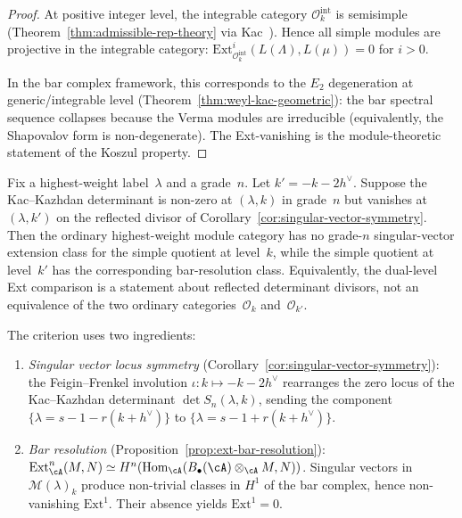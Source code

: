 \begin{proof}
At positive integer level, the integrable category
$\mathcal{O}_k^{\mathrm{int}}$ is semisimple
(Theorem~\ref{thm:admissible-rep-theory} via Kac~\cite{Kac}).
Hence all simple modules are projective in the integrable
category: $\mathrm{Ext}^i_{\mathcal{O}_k^{\mathrm{int}}}
(L(\Lambda), L(\mu)) = 0$ for $i > 0$.

In the bar complex framework, this corresponds to the $E_2$
degeneration at generic/integrable level
(Theorem~\ref{thm:weyl-kac-geometric}): the bar spectral
sequence collapses because the Verma modules are irreducible
(equivalently, the Shapovalov form is non-degenerate). The
Ext-vanishing is the module-theoretic statement of the Koszul
property.
\end{proof}

\begin{proposition}
\label{prop:ext-koszul-dual-level}
Fix a highest-weight label~$\lambda$ and a grade~$n$. Let
$k'=-k-2h^\vee$. Suppose the Kac--Kazhdan determinant is non-zero at
$(\lambda,k)$ in grade~$n$ but vanishes at $(\lambda,k')$ on the
reflected divisor of Corollary~\ref{cor:singular-vector-symmetry}.
Then the ordinary highest-weight module category has no grade-$n$
singular-vector extension class for the simple quotient at level~$k$,
while the simple quotient at level~$k'$ has the corresponding
bar-resolution class. Equivalently, the dual-level Ext comparison is a
statement about reflected determinant divisors, not an equivalence of
the two ordinary categories~$\mathcal O_k$ and~$\mathcal O_{k'}$.

The criterion uses two ingredients:
\begin{enumerate}[label=\textup{(\roman*)}]
\item \emph{Singular vector locus symmetry}
 (Corollary~\ref{cor:singular-vector-symmetry}): the
 Feigin--Frenkel involution
 $\iota\colon k \mapsto -k - 2h^\vee$ rearranges the zero locus
 of the Kac--Kazhdan determinant $\det S_n(\lambda, k)$,
 sending the component $\{\lambda = s{-}1{-}r(k{+}h^\vee)\}$ to
 $\{\lambda = s{-}1{+}r(k{+}h^\vee)\}$.

\item \emph{Bar resolution} (Proposition~\ref{prop:ext-bar-resolution}):
 $\mathrm{Ext}^n_\cA(M, N) \simeq
 H^n(\mathrm{Hom}_\cA(B_\bullet(\cA) \otimes_\cA M, N))$.
 Singular vectors in~$\mathcal{M}(\lambda)_k$ produce non-trivial
 classes in $H^1$ of the bar complex, hence non-vanishing
 $\mathrm{Ext}^1$. Their absence yields $\mathrm{Ext}^1 = 0$.
\end{enumerate}


\end{proposition}

